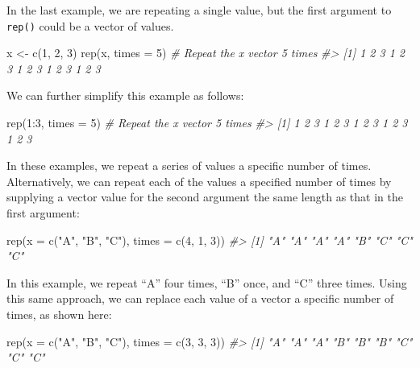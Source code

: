 \documentclass[
]{book}
\newenvironment{Shaded}{\begin{snugshade}}{\end{snugshade}}
\newcommand{\AttributeTok}[1]{\textcolor[rgb]{0.77,0.63,0.00}{#1}}
\newcommand{\CommentTok}[1]{\textcolor[rgb]{0.56,0.35,0.01}{\textit{#1}}}
\newcommand{\DecValTok}[1]{\textcolor[rgb]{0.00,0.00,0.81}{#1}}
\newcommand{\FunctionTok}[1]{\textcolor[rgb]{0.00,0.00,0.00}{#1}}
\newcommand{\NormalTok}[1]{#1}
\newcommand{\OtherTok}[1]{\textcolor[rgb]{0.56,0.35,0.01}{#1}}
\newcommand{\SpecialCharTok}[1]{\textcolor[rgb]{0.00,0.00,0.00}{#1}}
\newcommand{\StringTok}[1]{\textcolor[rgb]{0.31,0.60,0.02}{#1}}
\begin{document}
In the last example, we are repeating a single value, but the first argument to \texttt{rep()} could be a vector of values.

\begin{Shaded}
\begin{Highlighting}[]
\NormalTok{x }\OtherTok{\textless{}{-}} \FunctionTok{c}\NormalTok{(}\DecValTok{1}\NormalTok{, }\DecValTok{2}\NormalTok{, }\DecValTok{3}\NormalTok{)}
\FunctionTok{rep}\NormalTok{(x, }\AttributeTok{times =} \DecValTok{5}\NormalTok{) }\CommentTok{\# Repeat the x vector 5 times}
\CommentTok{\#\textgreater{}  [1] 1 2 3 1 2 3 1 2 3 1 2 3 1 2 3}
\end{Highlighting}
\end{Shaded}

We can further simplify this example as follows:

\begin{Shaded}
\begin{Highlighting}[]
\FunctionTok{rep}\NormalTok{(}\DecValTok{1}\SpecialCharTok{:}\DecValTok{3}\NormalTok{, }\AttributeTok{times =} \DecValTok{5}\NormalTok{) }\CommentTok{\# Repeat the x vector 5 times}
\CommentTok{\#\textgreater{}  [1] 1 2 3 1 2 3 1 2 3 1 2 3 1 2 3}
\end{Highlighting}
\end{Shaded}

In these examples, we repeat a series of values a specific number of times. Alternatively, we can repeat each of the values a specified number of times by supplying a vector value for the second argument the same length as that in the first argument:

\begin{Shaded}
\begin{Highlighting}[]
\FunctionTok{rep}\NormalTok{(}\AttributeTok{x =} \FunctionTok{c}\NormalTok{(}\StringTok{"A"}\NormalTok{, }\StringTok{"B"}\NormalTok{, }\StringTok{"C"}\NormalTok{), }\AttributeTok{times =} \FunctionTok{c}\NormalTok{(}\DecValTok{4}\NormalTok{, }\DecValTok{1}\NormalTok{, }\DecValTok{3}\NormalTok{))}
\CommentTok{\#\textgreater{} [1] "A" "A" "A" "A" "B" "C" "C" "C"}
\end{Highlighting}
\end{Shaded}

In this example, we repeat ``A'' four times, ``B'' once, and ``C'' three times. Using this same approach, we can replace each value of a vector a specific number of times, as shown here:

\begin{Shaded}
\begin{Highlighting}[]
\FunctionTok{rep}\NormalTok{(}\AttributeTok{x =} \FunctionTok{c}\NormalTok{(}\StringTok{"A"}\NormalTok{, }\StringTok{"B"}\NormalTok{, }\StringTok{"C"}\NormalTok{), }\AttributeTok{times =} \FunctionTok{c}\NormalTok{(}\DecValTok{3}\NormalTok{, }\DecValTok{3}\NormalTok{, }\DecValTok{3}\NormalTok{))}
\CommentTok{\#\textgreater{} [1] "A" "A" "A" "B" "B" "B" "C" "C" "C"}
\end{Highlighting}
\end{Shaded}
\end{document}
